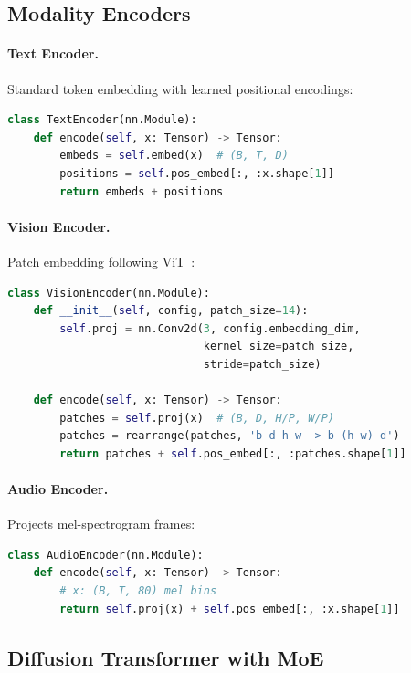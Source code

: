 \documentclass[11pt,twocolumn]{article}
\begin{document}
\subsection{Modality Encoders}

\paragraph{Text Encoder.} Standard token embedding with learned positional encodings:

\begin{lstlisting}[language=Python]
class TextEncoder(nn.Module):
    def encode(self, x: Tensor) -> Tensor:
        embeds = self.embed(x)  # (B, T, D)
        positions = self.pos_embed[:, :x.shape[1]]
        return embeds + positions
\end{lstlisting}

\paragraph{Vision Encoder.} Patch embedding following ViT~\cite{vit2020}:

\begin{lstlisting}[language=Python]
class VisionEncoder(nn.Module):
    def __init__(self, config, patch_size=14):
        self.proj = nn.Conv2d(3, config.embedding_dim,
                              kernel_size=patch_size,
                              stride=patch_size)

    def encode(self, x: Tensor) -> Tensor:
        patches = self.proj(x)  # (B, D, H/P, W/P)
        patches = rearrange(patches, 'b d h w -> b (h w) d')
        return patches + self.pos_embed[:, :patches.shape[1]]
\end{lstlisting}

\paragraph{Audio Encoder.} Projects mel-spectrogram frames:

\begin{lstlisting}[language=Python]
class AudioEncoder(nn.Module):
    def encode(self, x: Tensor) -> Tensor:
        # x: (B, T, 80) mel bins
        return self.proj(x) + self.pos_embed[:, :x.shape[1]]
\end{lstlisting}

\subsection{Diffusion Transformer with MoE}
\end{document}
